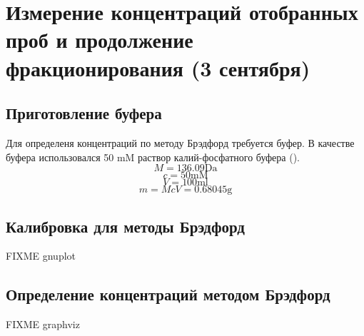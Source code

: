 \section{Измерение концентраций отобранных проб и продолжение фракционирования (3 сентября)}
\subsection{Приготовление буфера}
Для определеня концентраций по методу Брэдфорд требуется буфер.
В качестве буфера использовался 50 mM раствор калий-фосфатного буфера ().
$$ M = 136.09 \text{Da} $$
$$ c = 50 \text{mM} $$
$$ V = 100 \text{ml} $$
$$ m = McV = 0.68045 \text{g} $$

\subsection{Калибровка для методы Брэдфорд}

FIXME gnuplot

\subsection{Определение концентраций методом Брэдфорд}

FIXME graphviz

